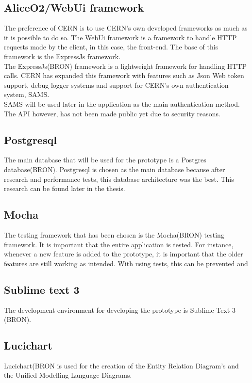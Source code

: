 \documentclass[paper=a4, fontsize=11pt,twoside]{scrartcl}	%
\begin{document}
\subsection{AliceO2/WebUi framework}
The preference of CERN is to use CERN's own developed frameworks as much as it is possible to do so. The WebUi framework is a framework to handle HTTP requests made by the client, in this case, the front-end. The base of this framework is the ExpressJs framework. \\
The ExpressJs(BRON) framework is a lightweight framework for handling HTTP calls. CERN has expanded this framework with features such as Json Web token support, debug logger systems and support for CERN's own authentication system, SAMS. \\
SAMS will be used later in the application as the main authentication method. The API however, has not been made public yet due to security reasons. 

\subsection{Postgresql}
The main database that will be used for the prototype is a Postgres database(BRON). Postgresql is chosen as the main database because after research and performance tests, this database architecture was the best. This research can be found later in the thesis.

\subsection{Mocha}
The testing framework that has been chosen is the Mocha(BRON) testing framework. It is important that the entire application is tested. For instance, whenever a new feature is added to the prototype, it is important that the older features are still working as intended. With using tests, this can be prevented and 

\subsection{Sublime text 3}
The development environment for developing the prototype is Sublime Text 3 (BRON).

\subsection{Lucichart}
Lucichart(BRON is used for the creation of the Entity Relation Diagram's and the Unified Modelling Language Diagrams.
\end{document}
